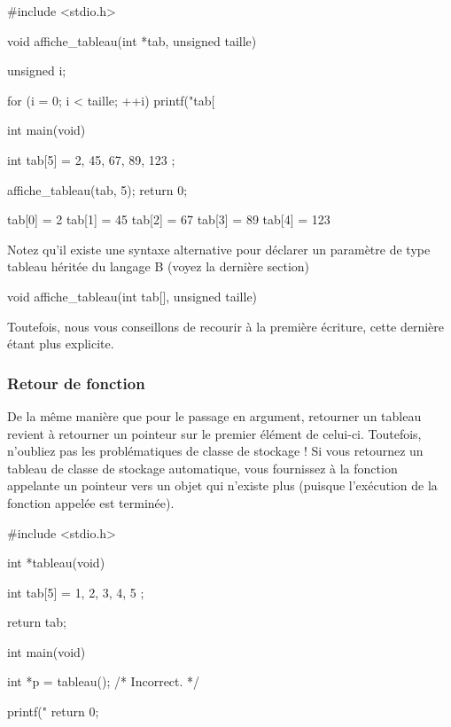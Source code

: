 \begin{C}
#include <stdio.h>


void affiche_tableau(int *tab, unsigned taille)
{
    unsigned i;

    for (i = 0; i < taille; ++i)
        printf("tab[%
}


int main(void)
{
    int tab[5] = { 2, 45, 67, 89, 123 };

    affiche_tableau(tab, 5);
    return 0;
}
\end{C}

\begin{C}
tab[0] = 2
tab[1] = 45
tab[2] = 67
tab[3] = 89
tab[4] = 123
\end{C}

\begin{infobox}
Notez qu'il existe une syntaxe
alternative pour déclarer un paramètre de type tableau héritée du
langage B (voyez la dernière section)

\begin{C}
 void affiche_tableau(int tab[], unsigned taille)
\end{C}

Toutefois, nous vous conseillons de recourir à la
première écriture, cette dernière étant plus explicite.
\end{infobox}

\subsubsection{Retour de fonction}
\label{retour-de-fonction-1}

De la même manière que pour le passage en argument, retourner un tableau
revient à retourner un pointeur sur le premier élément de celui-ci.
Toutefois, n'oubliez pas les problématiques de classe de stockage ! Si
vous retournez un tableau de classe de stockage automatique, vous
fournissez à la fonction appelante un pointeur vers un objet qui
n'existe plus (puisque l'exécution de la fonction appelée est terminée).

\begin{C}
 #include <stdio.h>


int *tableau(void)
{
    int tab[5] = { 1, 2, 3, 4, 5 };

    return tab;
}


int main(void)
{
    int *p = tableau(); /* Incorrect. */

    printf("%
    return 0;
}
\end{C}

